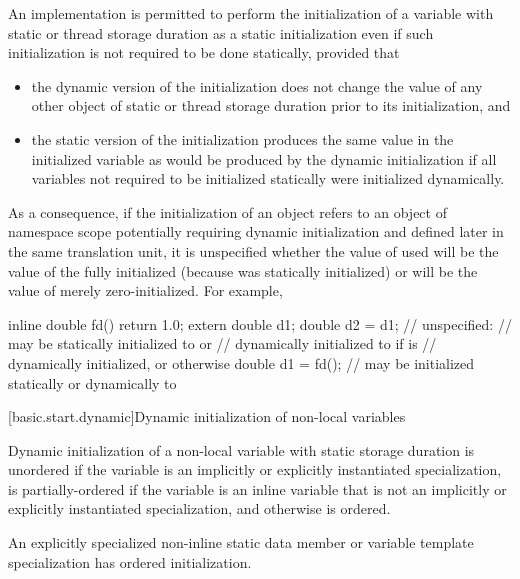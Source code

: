 \pnum
An implementation is permitted to perform the initialization of a
variable with static or thread storage duration as a static
initialization even if such initialization is not required to be done
statically, provided that
\begin{itemize}
\item
the dynamic version of the initialization does not change the
value of any other object of static or thread storage duration
prior to its initialization, and

\item
the static version of the initialization produces the same value
in the initialized variable as would be produced by the dynamic
initialization if all variables not required to be initialized statically
were initialized dynamically.
\end{itemize}
\begin{note}
As a consequence, if the initialization of an object  refers to an
object  of namespace scope potentially requiring dynamic initialization and defined
later in the same translation unit, it is unspecified whether the value of  used
will be the value of the fully initialized  (because  was statically
initialized) or will be the value of  merely zero-initialized. For example,
\begin{codeblock}
inline double fd() { return 1.0; }
extern double d1;
double d2 = d1;     // unspecified:
                    // may be statically initialized to  or
                    // dynamically initialized to  if  is
                    // dynamically initialized, or  otherwise
double d1 = fd();   // may be initialized statically or dynamically to 
\end{codeblock}
\end{note}

[basic.start.dynamic]{Dynamic initialization of non-local variables}

\pnum
{}%
%
%
Dynamic initialization of a non-local variable with static storage duration is
unordered if the variable is an implicitly or explicitly instantiated
specialization, is partially-ordered if the variable
is an inline variable that is not an implicitly or explicitly instantiated
specialization, and otherwise is ordered.
\begin{note} An explicitly specialized non-inline static data member or
variable template specialization has ordered initialization.\end{note}

